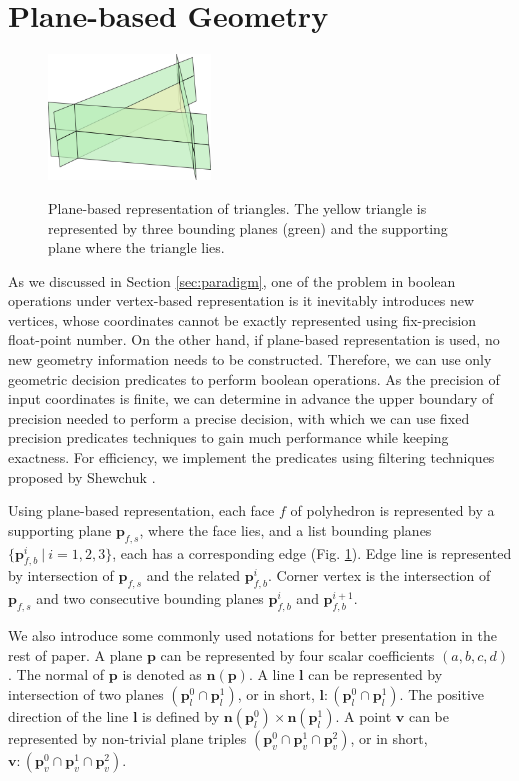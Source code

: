 \documentclass[10pt,journal,compsoc]{IEEEtran}
\begin{document}
\section{Plane-based Geometry}

\begin{figure}
  \centering
  \includegraphics[width=1.7in]{p-reps}\\
  \caption{Plane-based representation of triangles. The yellow triangle is represented by three bounding planes (green) and the supporting plane where the triangle lies.}\label{fig:p-reps}
\end{figure}

As we discussed in Section \ref{sec:paradigm}, one of the problem in boolean operations under vertex-based representation is it inevitably introduces new vertices, whose coordinates cannot be exactly represented using fix-precision float-point number. On the other hand, if plane-based representation is used, no new geometry information needs to be constructed. Therefore, we can use only geometric decision predicates to perform boolean operations. As the precision of input coordinates is finite, we can determine in advance the upper boundary of precision needed to perform a precise decision, with which we can use fixed precision predicates techniques to gain much performance while keeping exactness. For efficiency, we implement the predicates using filtering techniques proposed by Shewchuk \cite{shewchuk1997adaptive}.

Using plane-based representation, each face $f$ of polyhedron is represented by a supporting plane $\bm{p}_{f,s}$, where the face lies, and a list bounding planes $\{\bm{p}_{f,b}^i \ \vert\  i = 1, 2, 3\}$, each has a corresponding edge (Fig. \ref{fig:p-reps}). Edge line is represented by intersection of $\bm{p}_{f,s}$ and the related $\bm{p}_{f,b}^i$. Corner vertex is the intersection of $\bm{p}_{f,s}$ and two consecutive bounding planes $\bm{p}_{f,b}^i$ and $\bm{p}_{f,b}^{i+1}$.

We also introduce some commonly used notations for better presentation in the rest of paper. A plane $\bm{p}$ can be represented by four scalar coefficients $(a, b, c, d)$. The normal of $\bm{p}$ is denoted as $\bm{n}(\bm{p})$. A line $\bm{l}$ can be represented by intersection of two planes $(\bm{p}_l^0 \cap \bm{p}_l^1)$, or in short, $\bm{l}\colon(\bm{p}_l^0 \cap \bm{p}_l^1)$. The positive direction of the line $\bm{l}$ is defined by $\bm{n}(\bm{p}_l^0) \times \bm{n}(\bm{p}_l^1)$. A point $\bm{v}$ can be represented by non-trivial plane triples $(\bm{p}_v^0 \cap \bm{p}_v^1 \cap \bm{p}_v^2)$, or in short, $\bm{v}\colon(\bm{p}_v^0 \cap \bm{p}_v^1 \cap \bm{p}_v^2)$.
\end{document}
